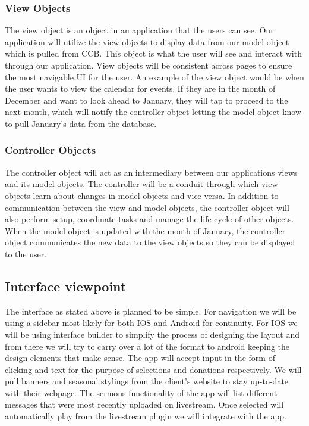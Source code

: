 \documentclass[letterpaper,10pt,draftclsnofoot,onecolumn,titlepage]{IEEEtran}
\begin{document}
			\subsubsection{View Objects}
				The view object is an object in an application that the users can see.
				Our application will utilize the view objects to display data from our model object which is pulled from CCB.
				This object is what the user will see and interact with through our application.
				View objects will be consistent across pages to ensure the most navigable UI for the user.
				An example of the view object would be when the user wants to view the calendar for events.
				If they are in the month of December and want to look ahead to January, they will tap to proceed to the next month, which will notify the controller object letting the model object know to pull January's data from the database.

			\subsubsection{Controller Objects}
				The controller object will act as an intermediary between our applications views and its model objects.
				The controller will be a conduit through which view objects learn about changes in model objects and vice versa.
				In addition to communication between the view and model objects, the controller object will also perform setup, coordinate tasks and manage the life cycle of other objects.
				When the model object is updated with the month of January, the controller object communicates the new data to the view objects so they can be displayed to the user.


		\subsection{Interface viewpoint}
			The interface as stated above is planned to be simple.
			For navigation we will be using a sidebar most likely for both IOS and Android for continuity.
			For IOS we will be using interface builder to simplify the process of designing the layout and from there we will try to carry over a lot of the format to android keeping the design elements that make sense.
			The app will accept input in the form of clicking and text for the purpose of selections and donations respectively.
			We will pull banners and seasonal stylings from the client’s website to stay up-to-date with their webpage.
			The sermons functionality of the app will list different messages that were most recently uploaded on livestream.
			Once selected will automatically play from the livestream plugin we will integrate with the app.
\end{document}
